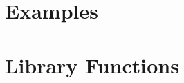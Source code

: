 \documentclass[letterpaper,11pt]{report}
\begin{document}
\part{Examples}
\label{sect-samples}
%

%
\part{Library Functions}
\label{sect-libs}
%


%
%
\end{document}
